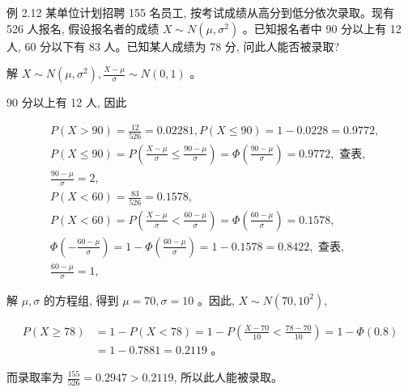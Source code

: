 \documentclass{beamer}
\begin{document}
	\begin{frame}
		例 2.12 某单位计划招聘 155 名员工, 按考试成绩从高分到低分依次录取。现有 526 人报名, 假设报名者的成绩 $X \sim N\left(\mu, \sigma^{2}\right)$ 。已知报名者中 90 分以上有 12 人, 60 分以下有 83 人。已知某人成绩为 78 分, 问此人能否被录取?
	\end{frame}
	
	\begin{frame}
		解 $X \sim N\left(\mu, \sigma^{2}\right), \frac{X-\mu}{\sigma} \sim N(0,1)$ 。
		
		90 分以上有 12 人, 因此
		
		$$
		\begin{aligned}
			& P(X>90)=\frac{12}{526}=0.02281, P(X \leqslant 90)=1-0.0228=0.9772, \\
			& P(X \leqslant 90)=P\left(\frac{X-\mu}{\sigma} \leqslant \frac{90-\mu}{\sigma}\right)=\Phi\left(\frac{90-\mu}{\sigma}\right)=0.9772, \text { 查表, } \\
			&\frac{90-\mu}{\sigma}=2, \\
			& P(X<60)=\frac{83}{526}=0.1578, \\
			& P(X<60)=P\left(\frac{X-\mu}{\sigma}<\frac{60-\mu}{\sigma}\right)=\Phi\left(\frac{60-\mu}{\sigma}\right)=0.1578, \\
			& \Phi\left(-\frac{60-\mu}{\sigma}\right)=1-\Phi\left(\frac{60-\mu}{\sigma}\right)=1-0.1578=0.8422, \text { 查表, }\\
			&\frac{60-\mu}{\sigma}=1,
		\end{aligned}
		$$
		
		
	\end{frame}
	
	\begin{frame}
		解 $\mu, \sigma$ 的方程组, 得到 $\mu=70, \sigma=10$ 。因此, $X \sim N\left(70,10^{2}\right)$,
		
		$$
		\begin{aligned}
			P(X \geqslant 78) & =1-P(X<78)=1-P\left(\frac{X-70}{10}<\frac{78-70}{10}\right)=1-\Phi(0.8) \\
			& =1-0.7881=0.2119 \text { 。 }
		\end{aligned}
		$$
		
		而录取率为 $\frac{155}{526}=0.2947>0.2119$, 所以此人能被录取。
	\end{frame}
	
\end{document}
